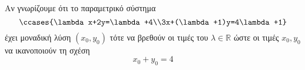 Αν γνωρίζουμε ότι το παραμετρικό σύστημα
\[ \ccases{\lambda x+2y=\lambda+4\\3x+(\lambda+1)y=4\lambda+1} \]
έχει μοναδική λύση $ (x_0,y_0) $ τότε να βρεθούν οι τιμές του $ \lambda\in\mathbb{R} $ ώστε οι τιμές $ x_0,y_0 $ να ικανοποιούν τη σχέση
\[ x_0+y_0=4 \]
